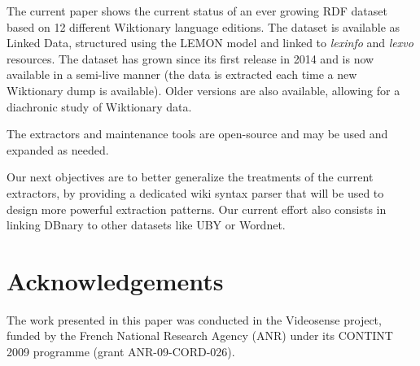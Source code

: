 \documentclass[10pt, a4paper]{article}
\begin{document}
The current paper shows the current status of an ever growing RDF dataset based on 12 different Wiktionary language editions. The dataset is available as Linked Data, structured using the LEMON model and linked to \emph{lexinfo} and \emph{lexvo} resources. The dataset has grown since its first release in 2014 and is now available in a semi-live manner (the data is extracted each time a new Wiktionary dump is available). Older versions are also available, allowing for a diachronic study of Wiktionary data.

The extractors and maintenance tools are open-source and may be used and expanded as needed.  

Our next objectives are to better generalize the treatments of the current extractors, by providing a dedicated wiki syntax parser that will be used to design more powerful extraction patterns. Our current effort also consists in linking DBnary to other datasets like UBY or Wordnet.


\section{Acknowledgements}

The work presented in this paper was conducted in the Videosense project, funded by the French National Research Agency (ANR) under its CONTINT 2009 programme (grant ANR-09-CORD-026).


\end{document}

